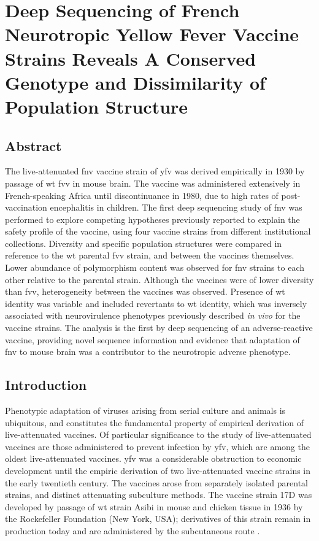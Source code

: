 \chapter{Deep Sequencing of French Neurotropic Yellow Fever
	Vaccine Strains Reveals A Conserved Genotype and Dissimilarity of Population
	Structure}
\section{Abstract}
The live-attenuated \gls{fnv} vaccine strain of \gls{yfv} was derived empirically in 1930 by passage of \gls{wt} \gls{fvv} in mouse brain. The vaccine was administered extensively in French-speaking Africa until discontinuance in 1980, due to high rates of post-vaccination encephalitis in children. The first deep sequencing study of \gls{fnv} was performed to explore competing hypotheses previously reported to explain the safety profile of the vaccine, using four vaccine strains from different institutional collections. Diversity and specific population structures were compared in reference to the \gls{wt} parental \gls{fvv} strain, and between the vaccines themselves. Lower abundance of polymorphism content was observed for \gls{fnv} strains to each other relative to the parental strain. Although the vaccines were of lower diversity than \gls{fvv}, heterogeneity between the vaccines was observed. Presence of \gls{wt} identity was variable and included revertants to \gls{wt} identity, which was inversely associated with neurovirulence phenotypes previously described \emph{in vivo} for the vaccine strains. The analysis is the first by deep sequencing of an adverse-reactive vaccine, providing novel sequence information and evidence that adaptation of \gls{fnv} to mouse brain was a contributor to the neurotropic adverse phenotype.
\section{Introduction}
Phenotypic adaptation of viruses arising from serial culture and animals is ubiquitous, and constitutes the fundamental property of empirical derivation of live-attenuated vaccines. Of particular significance to the study of live-attenuated vaccines are those administered to prevent infection by \gls{yfv}, which are among the oldest live-attenuated vaccines. \Gls{yfv} was a considerable obstruction to economic development until the empiric derivation of two live-attenuated vaccine strains in the early twentieth century. The vaccines arose from separately isolated parental strains, and distinct attenuating subculture methods. The vaccine strain 17D was developed by passage of \gls{wt} strain Asibi in mouse and chicken tissue in 1936 by the Rockefeller Foundation (New York, USA); derivatives of this strain remain in production today and are administered by the subcutaneous route \parencite{Theiler:1937wy}. 

